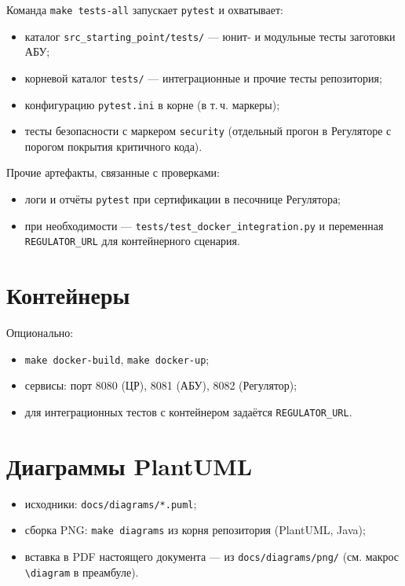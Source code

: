 Команда \texttt{make tests-all} запускает \texttt{pytest} и охватывает:

\begin{itemize}
  \item каталог \texttt{src\_starting\_point/tests/} --- юнит- и модульные тесты заготовки АБУ;
  \item корневой каталог \texttt{tests/} --- интеграционные и прочие тесты репозитория;
  \item конфигурацию \texttt{pytest.ini} в корне (в т.\,ч. маркеры);
  \item тесты безопасности с маркером \texttt{security} (отдельный прогон в Регуляторе с порогом покрытия критичного кода).
\end{itemize}

Прочие артефакты, связанные с проверками:

\begin{itemize}
  \item логи и отчёты \texttt{pytest} при сертификации в песочнице Регулятора;
  \item при необходимости --- \texttt{tests/test\_docker\_integration.py} и переменная \texttt{REGULATOR\_URL} для контейнерного сценария.
\end{itemize}

\section{Контейнеры}

Опционально:

\begin{itemize}
  \item \texttt{make docker-build}, \texttt{make docker-up};
  \item сервисы: порт 8080 (ЦР), 8081 (АБУ), 8082 (Регулятор);
  \item для интеграционных тестов с контейнером задаётся \texttt{REGULATOR\_URL}.
\end{itemize}

\section{Диаграммы PlantUML}

\begin{itemize}
  \item исходники: \texttt{docs/diagrams/*.puml};
  \item сборка PNG: \texttt{make diagrams} из корня репозитория (PlantUML, Java);
  \item вставка в PDF настоящего документа --- из \texttt{docs/diagrams/png/} (см. макрос \texttt{\textbackslash diagram} в преамбуле).
\end{itemize}
